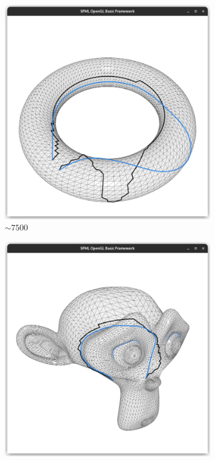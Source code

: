 \documentclass{stdlocal}
\begin{document}
\begin{figure}
  \centering
  \begin{subfigure}[b]{0.24\linewidth}
    \centering
    \includegraphics[width=\linewidth,trim={15px 20 15 50},clip]{images/torus-geodesic-1.png}
    \caption{$\sim 7500$}
  \end{subfigure}
  \begin{subfigure}[b]{0.24\linewidth}
    \centering
    \includegraphics[width=\linewidth,trim={15px 20 15 50},clip]{images/suzanne-geodesic-1.png}

\end{subfigure}
\end{figure}
\end{document}
